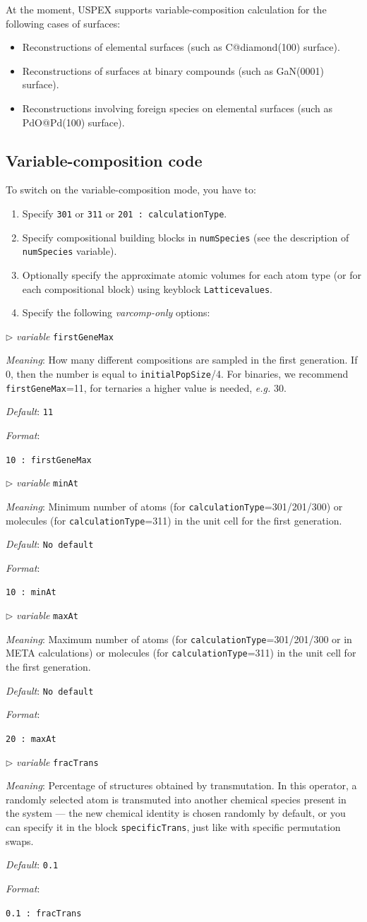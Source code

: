 \documentclass[12pt]{article}
\newcommand{\keyword}[1]{\texttt{#1}}
\newcommand{\paramacro}[6]{
\vspace{0.5cm}
$\triangleright$ \emph{variable} {\color{blue} \texttt{#1}}

\emph{Meaning}: {#2}

{#3}

\emph{Default}: \texttt{#4}

\emph{Format}:

{\addtolength{\leftskip}{10mm} 
\texttt{#5}
\par}


{\small #6}

}
\begin{document}
At the moment, USPEX supports variable-composition calculation for the following
cases of surfaces:
\begin{itemize}
\item Reconstructions of elemental surfaces (such as C@diamond(100) surface).
\item Reconstructions of surfaces at binary compounds (such as GaN(0001)
surface).
\item Reconstructions involving foreign species on elemental surfaces (such as
PdO@Pd(100) surface).
\end{itemize}


\subsection{Variable-composition code}

To switch on the variable-composition mode, you have to:
\begin{enumerate}
\item Specify \texttt{301} or \texttt{311} or \texttt{201  : calculationType}.
\item Specify compositional building blocks in \keyword{numSpecies} (see the
description of \keyword{numSpecies} variable).
\item Optionally specify the approximate atomic volumes for each atom type (or
for each compositional block) using keyblock \keyword{Latticevalues}.
\item Specify the following \textit{varcomp-only} options:
\end{enumerate}


\paramacro{firstGeneMax}{How many different compositions are sampled in the
first generation. If 0, then the number is equal to \keyword{initialPopSize}/4.
For binaries, we recommend \keyword{firstGeneMax}=11, for ternaries a higher
value is needed, \emph{e.g.} 30.}{}{11}{10 : firstGeneMax}{}

\paramacro{minAt}{Minimum number of atoms (for
\keyword{calculationType}=301/201/300) or molecules (for
\keyword{calculationType}=311) in the unit cell for the first generation.}{}{No
default}{10  : minAt}{}
 
\paramacro{maxAt}{Maximum number of atoms (for
\keyword{calculationType}=301/201/300 or in META calculations) or molecules (for
\keyword{calculationType}=311) in the unit cell for the first generation.}{}{No
default}{20  : maxAt}{}

\paramacro{fracTrans}{Percentage of structures obtained by transmutation. In
this operator, a randomly selected atom is transmuted into another chemical
species present in the system --- the new chemical identity is chosen randomly
by default, or you can specify it in the block \keyword{specificTrans}, just
like with specific permutation swaps.}{ }{0.1}{0.1   : fracTrans}{}
\end{document}
